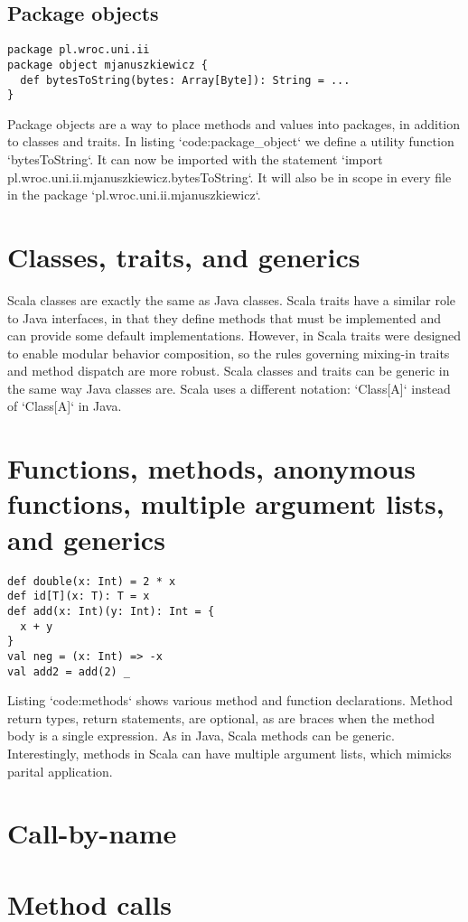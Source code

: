 \subsection{Package objects}

\begin{lstlisting}[caption=Package object, label=code:package\_object, escapechar=|, float, floatplacement=H]
package pl.wroc.uni.ii
package object mjanuszkiewicz {
  def bytesToString(bytes: Array[Byte]): String = ...
}
\end{lstlisting}

Package objects are a way to place methods and values into packages, in addition to classes and traits.
In listing `code:package\_object` we define a utility function `bytesToString`.
It can now be imported with the statement `import pl.wroc.uni.ii.mjanuszkiewicz.bytesToString`.
It will also be in scope in every file in the package `pl.wroc.uni.ii.mjanuszkiewicz`.

\section{Classes, traits, and generics}

Scala classes are exactly the same as Java classes.
Scala traits have a similar role to Java interfaces, in that they define methods that must be implemented and can provide some default implementations.
However, in Scala traits were designed to enable modular behavior composition, so the rules governing mixing-in traits and method dispatch are more robust.
Scala classes and traits can be generic in the same way Java classes are.
Scala uses a different notation: `Class[A]` instead of `Class[A]` in Java.

\section{Functions, methods, anonymous functions, multiple argument lists, and generics}

\begin{lstlisting}[caption=Methods and functions, label=code:methods, escapechar=|, float, floatplacement=H]
def double(x: Int) = 2 * x
def id[T](x: T): T = x
def add(x: Int)(y: Int): Int = {
  x + y
}
val neg = (x: Int) => -x
val add2 = add(2) _

\end{lstlisting}

Listing `code:methods` shows various method and function declarations.
Method return types, return statements, are optional, as are braces when the method body is a single expression.
As in Java, Scala methods can be generic.
Interestingly, methods in Scala can have multiple argument lists, which mimicks parital application.


\section{Call-by-name}

\section{Method calls}
